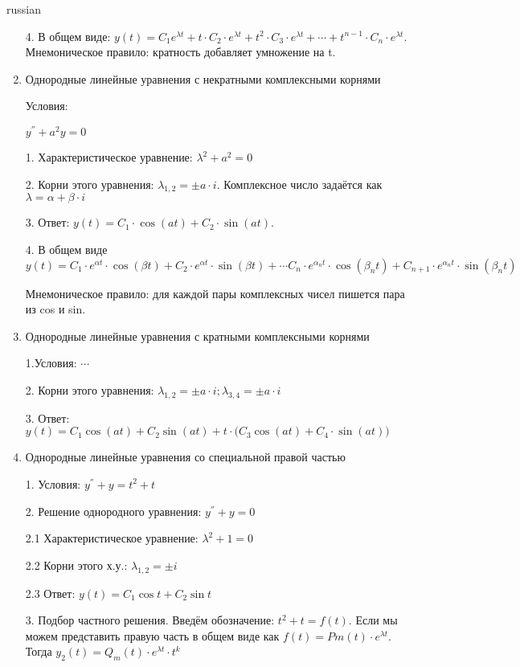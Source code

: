 \documentclass{article}
\begin{document}
\begin{otherlanguage*}{russian}
\begin{enumerate}
4. В общем виде: $ y(t) = C_1 e ^ {\lambda t} + t \cdot C_2 \cdot e^{\lambda t} + t^2 \cdot C_3 \cdot e^{\lambda t} + \cdots + t^{n-1} \cdot C_n \cdot e^{\lambda t} $. Мнемоническое правило: кратность добавляет умножение на t. 

\item Однородные линейные уравнения с некратными комплексными корнями

Условия: 

$ y ^{''} + a^2 y = 0$ 

1. Характеристическое уравнение: $ \lambda^ 2 + a ^ 2 = 0 $ 

2. Корни этого уравнения: $ \lambda_{1,2} = \pm a \cdot i$. Комплексное число задаётся как $ \lambda = \alpha + \beta \cdot i $ 

3. Ответ: $ y(t) = C_1 \cdot \cos(at) + C_2 \cdot \sin(at) $.  

4. В общем виде $ y(t) = C_1 \cdot e ^ {\alpha t} \cdot \cos (\beta t) + C_2 \cdot e^{\alpha t} \cdot \sin(\beta t) + \cdots  C_n \cdot e ^ {\alpha_n t} \cdot \cos (\beta_n t) + C_{n+1} \cdot e^{\alpha_n t} \cdot \sin(\beta_n t)$

Мнемоническое правило: для каждой пары комплексных чисел пишется пара из cos и sin. 
 
\item Однородные линейные уравнения с кратными комплексными корнями

1.Условия: $ \cdots $

2. Корни этого уравнения: $ \lambda_{1, 2} = \pm a \cdot i; \lambda_{3,4} = \pm a \cdot i$

3. Ответ: $ y(t) = C_1 \cos (at) + C_2 \sin (at) + t \cdot \Big( C_3 \cos (at) + C_4 \cdot \sin (at) \Big)$

\item Однородные линейные уравнения со специальной правой частью 

1. Условия: $y^{''} + y = t ^ 2 + t$

2. Решение однородного уравнения: $ y^{''} + y = 0 $

2.1 Характеристическое уравнение: $ \lambda ^ 2 + 1 = 0 $ 

2.2 Корни этого х.у.: $ \lambda_{1, 2} = \pm i $ 

2.3 Ответ: $ y(t) = C_1 \cos t + C_2 \sin t $ 

3. Подбор частного решения. Введём обозначение: $ t^2 + t = f(t) $. Если мы можем представить правую часть в общем виде как $ f(t) = Pm(t) \cdot e^{\lambda t}$. Тогда $ y_2 (t) = Q_m (t) \cdot e ^{\lambda t} \cdot t ^k $


\end{enumerate}
\end{otherlanguage*}
\end{document}
